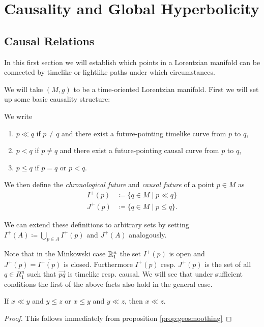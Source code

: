 \chapter{Causality and Global Hyperbolicity}
\section{Causal Relations}
In this first section we will establish which points in a Lorentzian manifold can be connected by timelike or lightlike paths under which circumstances. 

We will take $(M,g)$ to be a time-oriented Lorentzian manifold. First we will set up some basic causality structure:
\begin{definition}
We write
\begin{enumerate}
    \item $p\ll q$ if $p\neq q$ and there exist a future-pointing timelike curve from $p$ to $q$,
    \item $p<q$ if $p\neq q$ and there exist a future-pointing causal curve from $p$ to $q$,
    \item $p\leq q$ if $p=q$ or $p<q$.
\end{enumerate}
We then define the \emph{chronological future} and \emph{causal future} of a point $p\in M$ as
\begin{align*}
    I^+(p) &\coloneqq \{q\in M \mid p\ll q\}\\
    J^+(p) &\coloneqq \{q\in M \mid p\leq q\}.
\end{align*}

We can extend these definitions to arbitrary sets by setting $I^+(A)\coloneqq\bigcup_{p\in A}I^+(p)$ and $J^+(A)$ analogously.
\end{definition}

Note that in the Minkowski case $\mathbb{R}^n_1$ the set $I^+(p)$ is open and $J^+(p)=\overline{I^+(p)}$ is closed. Furthermore $I^+(p)$ resp. $J^+(p)$ is the set of all $q\in R^n_1$ such that $\overrightarrow{pq}$ is timelike resp. causal.
We will see that under sufficient conditions the first of the above facts also hold in the general case.

\begin{corollary}
If $x\ll y$ and $y\leq z$ or $x\leq y$ and $y\ll z$, then $x\ll z$.
\end{corollary}
\begin{proof}
This follows immediately from proposition \ref{prop:geosmoothing}
\end{proof}

